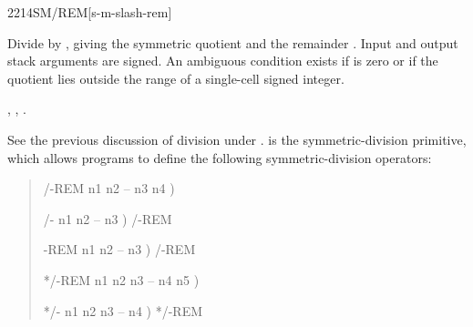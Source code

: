 \begin{worddef}{2214}{SM/REM}[s-m-slash-rem]
\item {}

	Divide  by , giving the symmetric quotient
	 and the remainder . Input and output stack
	arguments are signed. An ambiguous condition exists if 
	is zero or if the quotient lies outside the range of a single-cell
	signed integer.

\see {},
	,
	.

	\begin{defer}
	\rationale %
		See the previous discussion of division under .
		 is the symmetric-division primitive, which allows
		programs to define the following symmetric-division operators:

		\begin{quote}\ttfamily
			\word{:} /-REM  n1 n2 -- n3 n4 )
				   
			\word{;}

			\word{:} /-  n1 n2 -- n3 )
				/-REM  
			\word{;}

			\word{:} -REM  n1 n2 -- n3 )
				/-REM 
			\word{;}

			\word{:} */-REM  n1 n2 n3 -- n4 n5 )
				   
			\word{;}

			\word{:} */-  n1 n2 n3 -- n4 )
				*/-REM  
			\word{;}
		\end{quote}


\end{defer}
\end{worddef}
